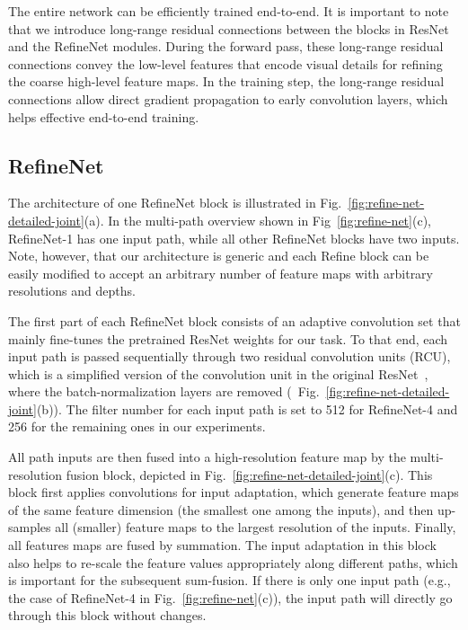 \documentclass[10pt,twocolumn,letterpaper]{article}
\newcommand{\Fig}{Fig.\xspace}
\newcommand{\myparagraph}[1]{\vspace{.5em}\noindent\textbf{#1}}
\newcommand{\refOurFig}{\ref{fig:refine-net}(c)\xspace}
\begin{document}
The entire network can be efficiently trained end-to-end. It is important to note that we introduce long-range residual connections between the blocks in ResNet and the RefineNet modules.
During the forward pass, these long-range residual connections convey the low-level features that encode visual details for refining the coarse high-level feature maps.
In the training step, the long-range residual connections allow direct gradient propagation to early convolution layers, which helps effective end-to-end training. 

\subsection{RefineNet}\label{sec:refinet_details}

The architecture of one RefineNet block is illustrated in Fig.~\ref{fig:refine-net-detailed-joint}(a).
In the multi-path overview shown in Fig~\refOurFig,  
RefineNet-1 has one input path, while all other RefineNet blocks have two inputs. Note, however, that our architecture is generic and each Refine block can be easily modified to accept an arbitrary number of feature maps with arbitrary resolutions and depths.

The first part of each RefineNet block consists of an adaptive convolution set that  mainly fine-tunes the pretrained ResNet weights for our task. To that end, each input path is passed sequentially through two residual convolution units (RCU), which is a simplified version of the convolution unit in the original ResNet~\cite{He:2016:ResNet}, where the batch-normalization layers are removed (\cf~\Fig~\ref{fig:refine-net-detailed-joint}(b)). The filter number for each input path is set to 512  for \mbox{RefineNet-4} and 256 for the remaining ones in our experiments.

All path inputs are then fused into a high-resolution feature map by the multi-resolution fusion block, depicted in \Fig~\ref{fig:refine-net-detailed-joint}(c).
This block first applies convolutions for input adaptation, which generate feature maps of the same feature dimension (the smallest one among the inputs),
and then up-samples all (smaller) feature maps to the largest resolution of the inputs. Finally, all features maps are fused by summation.
The input adaptation in this block also helps to re-scale the feature values appropriately along different paths, which is important for the subsequent sum-fusion.
If there is only one input path (e.g., the case of RefineNet-4 in \Fig~\ref{fig:refine-net}(c)), the input path will directly go through this block without changes.
\end{document}
